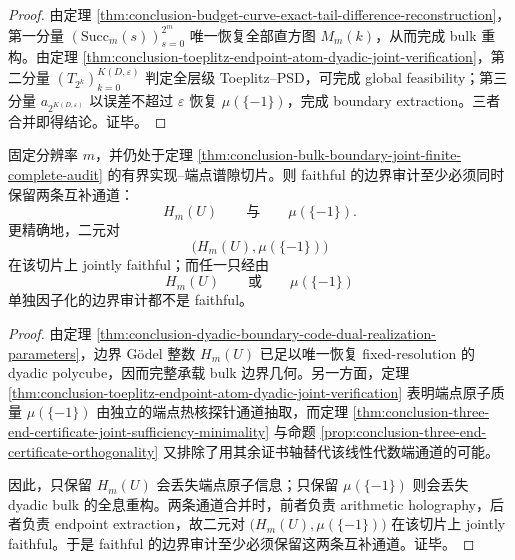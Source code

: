 \begin{proof}
由定理 \ref{thm:conclusion-budget-curve-exact-tail-difference-reconstruction}，第一分量 \((\mathrm{Succ}_m(s))_{s=0}^{2^m}\) 唯一恢复全部直方图 \(M_m(k)\)，从而完成 bulk 重构。由定理 \ref{thm:conclusion-toeplitz-endpoint-atom-dyadic-joint-verification}，第二分量 \((T_{2^k})_{k=0}^{K(D,\varepsilon)}\) 判定全层级 Toeplitz--PSD，可完成 global feasibility；第三分量 \(a_{2^{K(D,\varepsilon)}}\) 以误差不超过 \(\varepsilon\) 恢复 \(\mu(\{-1\})\)，完成 boundary extraction。三者合并即得结论。证毕。
\end{proof}

\begin{theorem}\label{thm:conclusion-bulk-boundary-endpoint-dual-channel-irreducibility}
固定分辨率 \(m\)，并仍处于定理 \ref{thm:conclusion-bulk-boundary-joint-finite-complete-audit} 的有界实现--端点谱隙切片。则 faithful 的边界审计至少必须同时保留两条互补通道：
\[
H_m(U)
\qquad\text{与}\qquad
\mu(\{-1\}).
\]
更精确地，二元对
\[
\bigl(H_m(U),\mu(\{-1\})\bigr)
\]
在该切片上 jointly faithful；而任一只经由
\[
H_m(U)
\qquad\text{或}\qquad
\mu(\{-1\})
\]
单独因子化的边界审计都不是 faithful。
\end{theorem}
\begin{proof}
由定理 \ref{thm:conclusion-dyadic-boundary-code-dual-realization-parameters}，边界 Gödel 整数 \(H_m(U)\) 已足以唯一恢复 fixed-resolution 的 dyadic polycube，因而完整承载 bulk 边界几何。另一方面，定理 \ref{thm:conclusion-toeplitz-endpoint-atom-dyadic-joint-verification} 表明端点原子质量 \(\mu(\{-1\})\) 由独立的端点热核探针通道抽取，而定理 \ref{thm:conclusion-three-end-certificate-joint-sufficiency-minimality} 与命题 \ref{prop:conclusion-three-end-certificate-orthogonality} 又排除了用其余证书轴替代该线性代数端通道的可能。

因此，只保留 \(H_m(U)\) 会丢失端点原子信息；只保留 \(\mu(\{-1\})\) 则会丢失 dyadic bulk 的全息重构。两条通道合并时，前者负责 arithmetic holography，后者负责 endpoint extraction，故二元对 \(\bigl(H_m(U),\mu(\{-1\})\bigr)\) 在该切片上 jointly faithful。于是 faithful 的边界审计至少必须保留这两条互补通道。证毕。
\end{proof}

